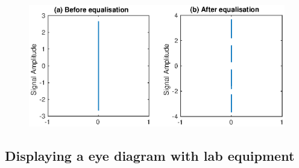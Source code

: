 \begin{figure}
    \begin{center}
        \includegraphics{Equaliser/scatter}
    \end{center}
    \caption{}
\end{figure}

\subsection{Displaying a eye diagram with lab equipment}
